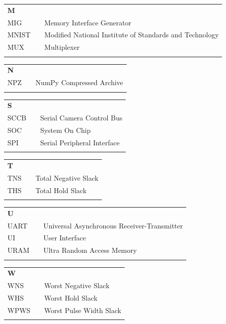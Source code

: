 \documentclass{jtetiskripsi}
\begin{document}
\begin{tabular}{p{20pt}p{3pt}l}
\textbf{M}\\
MIG & & Memory Interface Generator\\
MNIST & & Modified National Institute of Standards and Technology\\
MUX & & Multiplexer\\
\\
\end{tabular}

\begin{tabular}{p{20pt}p{3pt}l}
\textbf{N}\\
NPZ & & NumPy Compressed Archive\\
\\
\end{tabular}

\begin{tabular}{p{20pt}p{3pt}l}
\textbf{S}\\
SCCB & & Serial Camera Control Bus\\
SOC & & System On Chip\\
SPI & & Serial Peripheral Interface\\
\\
\end{tabular}

\begin{tabular}{p{20pt}p{3pt}l}
\textbf{T}\\
TNS & & Total Negative Slack\\
THS & & Total Hold Slack\\
\\
\end{tabular}

\begin{tabular}{p{20pt}p{3pt}l}
\textbf{U}\\
UART & & Universal Asynchronous Receiver-Transmitter\\
UI & & User Interface\\
URAM & & Ultra Random Access Memory\\
\\
\end{tabular}

\begin{tabular}{p{20pt}p{3pt}l}
\textbf{W}\\
WNS & & Worst Negative Slack\\
WHS & & Worst Hold Slack\\
WPWS & & Worst Pulse Width Slack\\
\\
\end{tabular}
\end{document}
